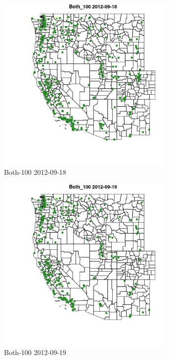 \begin{figure} 
\centering  
\includegraphics[width=0.77\textwidth]{Code_Outputs/ML_input_report_ML_input_PM25_Step5_part_d_de_duplicated_aves_ML_input_MapObsBoth_1002012-09-18.jpg} 
\caption{\label{fig:ML_input_report_ML_input_PM25_Step5_part_d_de_duplicated_aves_ML_inputMapObsBoth_1002012-09-18}Both-100 2012-09-18} 
\end{figure} 
 

\begin{figure} 
\centering  
\includegraphics[width=0.77\textwidth]{Code_Outputs/ML_input_report_ML_input_PM25_Step5_part_d_de_duplicated_aves_ML_input_MapObsBoth_1002012-09-19.jpg} 
\caption{\label{fig:ML_input_report_ML_input_PM25_Step5_part_d_de_duplicated_aves_ML_inputMapObsBoth_1002012-09-19}Both-100 2012-09-19} 
\end{figure} 
 

